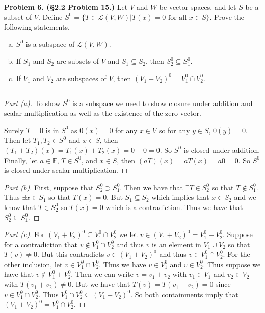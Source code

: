 \documentclass[leqno]{article}
\theoremstyle{nonumberplain}
\newtheorem{proof}{Proof}
\begin{document}
\pagebreak




\noindent\textbf{Problem 6. (\S 2.2 Problem 15.)} Let $V$ and $W$ be vector spaces, and let $S$ be a subset of $V$. Define $S^0=\{T \in \mathcal{L}(V,W) \vert T(x)=0 \textrm{ for all } x\in S\}$. Prove the following statements.
\begin{enumerate}[(a)]
\item $S^0$ is a subspace of $\mathcal{L}(V,W)$.
\item If $S_1$ and $S_2$ are subsets of $V$ and $S_1\subseteq S_2$, then $S_2^0 \subseteq S_1^0$.
\item If $V_1$ and $V_2$ are subspaces of $V$, then $(V_1+V_2)^0 = V_1^0\cap V_2^0$.
\end{enumerate}

\noindent\rule[0.5ex]{\linewidth}{1pt}

\begin{proof}[Part (a)]
To show $S^0$ is a subspace we need to show closure under addition and scalar multiplication as well as the existence of the zero vector.  

Surely $T=0$ is in $S^0$ as $0(x)=0$ for any $x\in V$ so for any $y\in S$, $0(y)=0$. Then let $T_1,T_2 \in S^0$ and $x\in S$, then $(T_1+T_2)(x)=T_1(x)+T_2(x)=0+0=0$.  So $S^0$ is closed under addition.  Finally, let $a\in \mathbb{F}$, $T\in S^0$, and $x\in S$, then $(aT)(x)=aT(x)=a0=0$. So $S^0$ is closed under scalar multiplication.
\end{proof}

\begin{proof}[Part (b)]
First, suppose that $S_2^0 \supset S_1^0$. Then we have that $\exists T \in S_2^0$ so that $T\notin S_1^0$.  Thus $\exists x \in S_1$ so that $T(x)=0$.  But $S_1\subseteq S_2$ which implies that $x\in S_2$ and we know that $T\in S_2^0$ so $T(x)=0$ which is a contradiction.  Thus we have that $S_2^0\subseteq S_1^0$.
\end{proof}

\begin{proof}[Part (c)]
For $(V_1+V_2)^0\subseteq V_1^0\cap V_2^0$ we let $v\in (V_1+V_2)^0=V_1^0+V_2^0$. Suppose for a contradiction that $v\notin V_1^0\cap V_2^0$ and thus $v$ is an element in $V_1\cup V_2$ so that $T(v)\neq 0$.  But this contradicts $v\in (V_1+V_2)^0$ and thus $v\in V_1^0\cap V_2^0$.
For the other inclusion, let $v\in V_1^0\cap V_2^0$. Thus we have $v\in V_1^0$ and $v\in V_2^0$. Thus suppose we have that $v\notin V_1^0 + V_2^0$. Then we can write $v=v_1+v_2$ with $v_1\in V_1$ and $v_2\in V_2$ with $T(v_1+v_2)\neq 0$. But we have that $T(v)=T(v_1+v_2)=0$ since $v\in V_1^0\cap V_2^0$. Thus $V_1^0\cap V_2^0\subseteq (V_1+V_2)^0$. So both containments imply that $(V_1+V_2)^0=V_1^0\cap V_2^0$.
\end{proof}
\pagebreak
\end{document}
